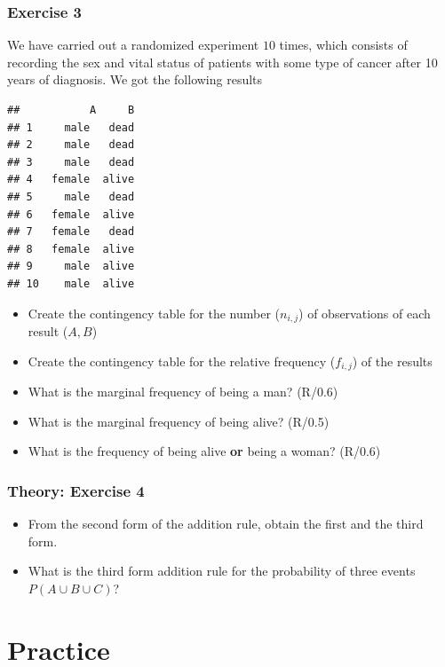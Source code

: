 \documentclass[
]{book}
\providecommand{\tightlist}{%
  \setlength{\itemsep}{0pt}\setlength{\parskip}{0pt}}
\begin{document}
\hypertarget{exercise-3}{%
\subsubsection{Exercise 3}\label{exercise-3}}

We have carried out a randomized experiment \(10\) times, which consists of recording the sex and vital status of patients with some type of cancer after 10 years of diagnosis. We got the following results

\begin{verbatim}
##           A     B
## 1     male   dead
## 2     male   dead
## 3     male   dead
## 4   female  alive
## 5     male   dead
## 6   female  alive
## 7   female   dead
## 8   female  alive
## 9     male  alive
## 10    male  alive
\end{verbatim}

\begin{itemize}
\tightlist
\item
  Create the contingency table for the number (\(n_{ i,j }\)) of observations of each result (\(A,B\))
\item
  Create the contingency table for the relative frequency (\(f_{ i,j }\)) of the results
\item
  What is the marginal frequency of being a man? (R/0.6)
\item
  What is the marginal frequency of being alive? (R/0.5)
\item
  What is the frequency of being alive \textbf{or} being a woman? (R/0.6)
\end{itemize}

\hypertarget{theory-exercise-4}{%
\subsubsection{Theory: Exercise 4}\label{theory-exercise-4}}

\begin{itemize}
\item
  From the second form of the addition rule, obtain the first and the third form.
\item
  What is the third form addition rule for the probability of three events \(P(A \cup B \cup C)\)?
\end{itemize}

\hypertarget{practice-1}{%
\section{Practice}\label{practice-1}}
\end{document}
